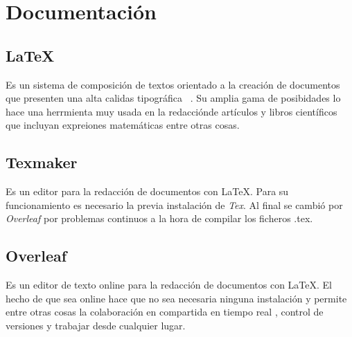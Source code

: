 \section{Documentación}
\subsection{\LaTeX}
Es un sistema de composición de textos orientado a la creación de documentos que presenten una alta calidas tipográfica ~\cite{wiki:latex}. Su amplia gama de posibidades lo hace una herrmienta muy usada en la redacciónde artículos y libros científicos que incluyan expreiones matemáticas entre otras cosas.
\subsection{Texmaker}
Es un editor para la redacción de documentos con \LaTeX. Para su funcionamiento es necesario la previa instalación de \emph{Tex}. Al final se cambió por \emph{Overleaf} por problemas continuos a la hora de compilar los ficheros .tex.
\subsection{Overleaf}
Es un editor de texto online para la redacción de documentos con \LaTeX. El hecho de que sea online hace que no sea necesaria ninguna instalación y permite entre otras cosas la colaboración en compartida en tiempo real , control de versiones y trabajar desde cualquier lugar.